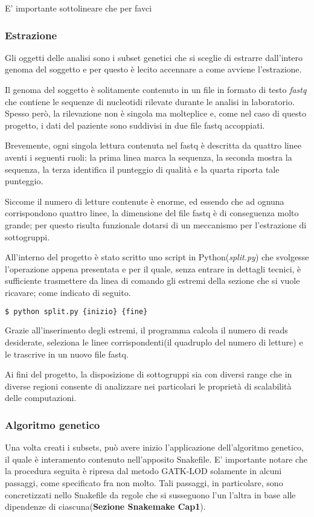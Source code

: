 E' importante sottolineare che per favci

\subsubsection{Estrazione}
Gli oggetti delle analisi sono i subset genetici che si sceglie di estrarre dall'intero genoma del soggetto e per questo è lecito accennare a come avviene l'estrazione.

Il genoma del soggetto è solitamente contenuto in un file in formato di testo \textit{fastq} che contiene le sequenze di nucleotidi rilevate durante le analisi in laboratorio.
Spesso però, la rilevazione non è singola ma molteplice e, come nel caso di questo progetto, i dati del paziente sono suddivisi in due file fastq accoppiati.


Brevemente, ogni singola lettura contenuta nel fastq è descritta da quattro linee aventi i seguenti ruoli: la prima linea marca la sequenza, la seconda mostra la sequenza, la terza identifica il punteggio di qualità e la quarta riporta tale punteggio.

Siccome il numero di letture contenute è enorme, ed essendo che ad ognuna corrispondono quattro linee, la dimensione del file fastq è di conseguenza molto grande; per questo risulta funzionale dotarsi di un meccanismo per l'estrazione di sottogruppi.

All'interno del progetto è stato scritto uno script in Python(\textit{split.py}) che svolgesse l'operazione appena presentata e per il quale, senza entrare in dettagli tecnici, è sufficiente trasmettere da linea di comando gli estremi della sezione che si vuole ricavare; come indicato di seguito.
\begin{lstlisting}[language=Python]
$ python split.py {inizio} {fine}
\end{lstlisting}
Grazie all'inserimento degli estremi, il programma calcola il numero di reads desiderate, seleziona le linee corrispondenti(il quadruplo del numero di letture) e le trascrive in un nuovo file fastq.

Ai fini del progetto, la disposizione di sottogruppi sia con diversi range che in diverse regioni consente di analizzare nei particolari le proprietà di scalabilità delle computazioni.


\subsubsection{Algoritmo genetico}
Una volta creati i subsets, può avere inizio l'applicazione dell'algoritmo genetico, il quale è interamento contenuto nell'apposito Snakefile.
E' importante notare che la procedura seguita è ripresa dal metodo GATK-LOD solamente in alcuni passaggi, come specificato fra non molto.
Tali passaggi, in particolare, sono concretizzati nello Snakefile da regole che si susseguono l'un l'altra in base alle dipendenze di ciascuna(\textbf{Sezione Snakemake Cap1}).

